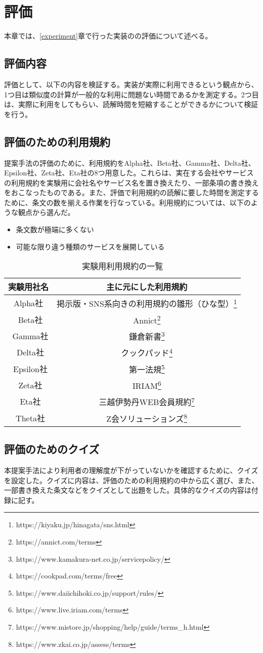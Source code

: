 \chapter{評価}
\label{discussion}
本章では、\ref{experiment}章で行った実装のの評価について述べる。

\section{評価内容}
評価として、以下の内容を検証する。実装が実際に利用できるという観点から、1つ目は類似度の計算が一般的な利用に問題ない時間であるかを測定する。2つ目は、実際に利用をしてもらい、読解時間を短縮することができるかについて検証を行う。

\section{評価のための利用規約}
提案手法の評価のために、利用規約をAlpha社、Beta社、Gamma社、Delta社、Epsilon社、Zeta社、Eta社の8つ用意した。これらは、実在する会社やサービスの利用規約を実験用に会社名やサービス名を置き換えたり、一部条項の書き換えをおこなったものである。また、評価で利用規約の読解に要した時間を測定するために、条文の数を揃える作業を行なっている。利用規約については、以下のような観点から選んだ。
\begin{itemize}
  \item 条文数が極端に多くない
  \item 可能な限り違う種類のサービスを展開している
\end{itemize}

\begin{table}[h]
  \centering
  \caption{実験用利用規約の一覧}
  \begin{tabular}{cc}
  \hline
  実験用社名    & 主に元にした利用規約\\ \hline\hline
  Alpha社   & 掲示版・SNS系向きの利用規約の雛形（ひな型）\footnote{https://kiyaku.jp/hinagata/sns.html}\\ \hline\
  Beta社    & Annict\footnote{https://annict.com/terms}\\ \hline\
  Gamma社   & 鎌倉新書\footnote{https://www.kamakura-net.co.jp/servicepolicy/}\\ \hline\
  Delta社   & クックパッド\footnote{https://cookpad.com/terms/free}\\ \hline\
  Epsilon社 & 第一法規\footnote{https://www.daiichihoki.co.jp/support/rules/}\\ \hline\
  Zeta社    & IRIAM\footnote{https://www.live.iriam.com/terms}\\ \hline\
  Eta社     & 三越伊勢丹WEB会員規約\footnote{https://www.mistore.jp/shopping/help/guide/terms\_h.html}\\ \hline\
  Theta社   & Z会ソリューションズ\footnote{https://www.zkai.co.jp/assess/terms}\\ \hline
  \end{tabular}
\end{table}

\section{評価のためのクイズ}
本提案手法により利用者の理解度が下がっていないかを確認するために、クイズを設定した。クイズに内容は、評価のための利用規約の中から広く選び、また、一部書き換えた条文などをクイズとして出題をした。具体的なクイズの内容は付録に記す。

